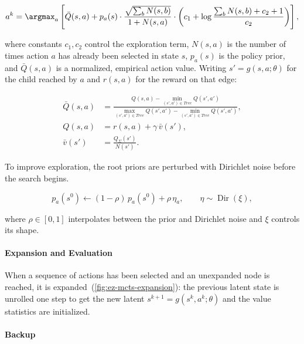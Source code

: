 \begin{equation}\label{eq:ez-puct}
  a^k = \argmax_a\left[
    \bar{Q}(s,a)
    + p_a(s)
      \cdot\frac{\sqrt{\sum_b N(s,b)}}{1+N(s,a)}
      \cdot\left(c_1+\log\frac{\sum_b N(s,b)+c_2+1}{c_2}\right)
  \right],
\end{equation}

where constants $c_1,c_2$ control the exploration term, $N(s,a)$ is the number
of times action $a$ has already been selected in state $s$, $p_a(s)$ is the
policy prior, and $\bar{Q}(s,a)$ is a normalized, empirical action value.
Writing $s'=g(s,a;\theta)$ for the child reached by $a$ and $r(s,a)$ for the
reward on that edge:

\begin{equation}\label{eq:ez-qnorm}
  \begin{aligned}
    \bar{Q}(s,a)
      &= \frac{Q(s,a)-\min_{(s',a')\in\mathit{Tree}} Q(s',a')}
              {\max_{(s',a')\in\mathit{Tree}} Q(s',a')-\min_{(s',a')\in\mathit{Tree}} Q(s',a')}, \\
    Q(s,a) &= r(s,a)+\gamma\,\bar{v}(s'), \\
    \bar{v}(s')  &= \frac{Q_\Sigma(s')}{N(s')}.
  \end{aligned}
\end{equation}

To improve exploration, the root priors are perturbed with Dirichlet noise
before the search begins.

\begin{equation}\label{eq:ez-dirichlet}
  p_a(s^0) \leftarrow (1-\rho)\,p_a(s^0)+\rho\,\eta_a,
  \qquad \eta\sim\operatorname{Dir}(\xi),
\end{equation}

where $\rho\in[0,1]$ interpolates between the prior and Dirichlet noise and $\xi$
controls its shape.

\paragraph{Expansion and Evaluation}\label{sec:ez-mcts-expansion}

When a sequence of actions has been selected and an unexpanded node is reached,
it is expanded~(\cref{fig:ez-mcts-expansion}): the previous latent state is
unrolled one step to get the new latent $s^{k+1}=g(s^k,a^k;\theta)$ and the value
statistics are initialized.

\paragraph{Backup}\label{sec:ez-mcts-backup}

